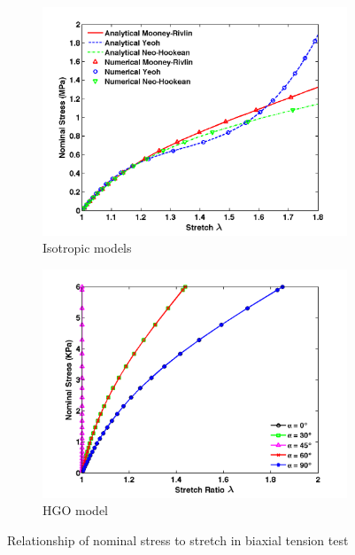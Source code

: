 \begin{figure}[H]
	\centering
	\begin{subfigure}[b]{0.45\textwidth}
		\centering
		\includegraphics[width=\textwidth]{./figures/biaxial1.png}
		\caption{Isotropic models}
		\label{fig:biaxial1}
	\end{subfigure}
	\begin{subfigure}[b]{0.45\textwidth}
		\centering
		\includegraphics[width=\textwidth]{./figures/biaxial2.png}
		\caption{HGO model}
		\label{fig:biaxial2}
	\end{subfigure}
	\caption{Relationship of nominal stress to stretch in biaxial tension test}
\end{figure}


